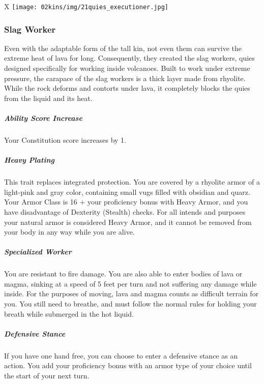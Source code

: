 \begin{linenumbers}
\begin{table*}[b]%
    \begin{DndTable}[width=\linewidth]{X}
        \texttt{[image: 02kins/img/21quies\_executioner.jpg]}
    \end{DndTable}
\end{table*}

\subsubsection{Slag Worker}
Even with the adaptable form of the tall kin, not even them can survive the extreme heat of lava for long.
Consequently, they created the slag workers, quies designed specifically for working inside volcanoes.
Built to work under extreme pressure, the carapace of the slag workers is a thick layer made from rhyolite.
While the rock deforms and contorts under lava, it completely blocks the quies from the liquid and its heat.

\subparagraph{Ability Score Increase} Your Constitution score increases by 1.

\subparagraph{Heavy Plating} This trait replaces integrated protection.
You are covered by a rhyolite armor of a light-pink and gray color, containing small vugs filled with obsidian and quarz.
Your Armor Class is 16 + your proficiency bonus with Heavy Armor, and you have disadvantage of Dexterity (Stealth) checks.
For all intends and purposes your natural armor is considered Heavy Armor, and it cannot be removed from your body in any way while you are alive.

\subparagraph{Specialized Worker} You are resistant to fire damage.
You are also able to enter bodies of lava or magma, sinking at a speed of 5 feet per turn and not suffering any damage while inside.
For the purposes of moving, lava and magma counts as difficult terrain for you.
You still need to breathe, and must follow the normal rules for holding your breath while submerged in the hot liquid.

\subparagraph{Defensive Stance} If you have one hand free, you can choose to enter a defensive stance as an action.
You add your proficiency bonus with an armor type of your choice until the start of your next turn.

\end{linenumbers}
